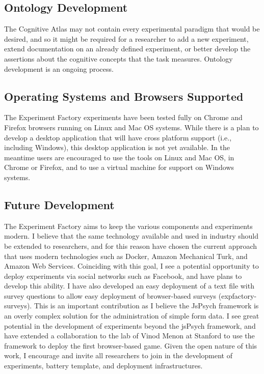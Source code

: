 \documentclass{report}
\begin{document}
\subsection{Ontology Development}

The Cognitive Atlas may not contain every experimental paradigm that
would be desired, and so it might be required for a researcher to add a
new experiment, extend documentation on an already defined experiment,
or better develop the assertions about the cognitive concepts that the
task measures. Ontology development is an ongoing process.

\subsection{Operating Systems and Browsers Supported}
The Experiment Factory experiments have been tested fully on Chrome and
Firefox browsers running on Linux and Mac OS systems. While there is a
plan to develop a desktop application that will have cross platform
support (i.e., including Windows), this desktop application is not yet
available. In the meantime users are encouraged to use the tools on
Linux and Mac OS, in Chrome or Firefox, and to use a virtual machine for
support on Windows systems.

\subsection{Future Development}

The Experiment Factory aims to keep the various components and
experiments modern. I believe that the same technology available and
used in industry should be extended to researchers, and for this reason
have chosen the current approach that uses modern technologies such as
Docker, Amazon Mechanical Turk, and Amazon Web Services. Coinciding with
this goal, I see a potential opportunity to deploy experiments via
social networks such as Facebook, and have plans to develop this
ability. I have also developed an easy deployment of a text file with
survey questions to allow easy deployment of browser-based surveys
(expfactory-surveys). This is an important contribution as I believe the
JsPsych framework is an overly complex solution for the administration
of simple form data. I see great potential in the development of
experiments beyond the jsPsych framework, and have extended a
collaboration to the lab of Vinod Menon at Stanford to use the framework
to deploy the first browser-based game. Given the open nature of this
work, I encourage and invite all researchers to join in the development
of experiments, battery template, and deployment infrastructures.
\end{document}
